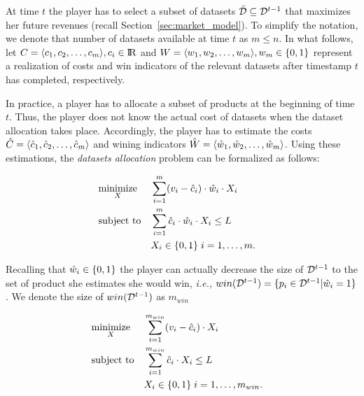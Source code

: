 At time $t$ the player has to select a subset of datasets $\bar{\mathcal{D}} \subseteq \mathcal{D}^{t-1}$ that maximizes her future revenues (recall Section~\ref{sec:market_model}). To simplify the notation, we denote that number of datasets available at time $t$ as $m\leq n$. In what follows, let $C = \langle c_1, c_2, \dots, c_{m}\rangle, c_i\in {\rm I\!R}$ and $W = \langle w_1, w_2, \dots, w_m\rangle, w_{m}\in \{0,1\}$ represent a realization of costs and win indicators of the relevant datasets after timestamp $t$ has completed, respectively.

In practice, a player has to allocate a subset of products at the beginning of time $t$. Thus, the player does not know the actual cost of datasets when the dataset allocation takes place. Accordingly, the player has to estimate the costs $\hat{C} = \langle \hat{c}_1, \hat{c}_2, \dots, \hat{c}_m\rangle$ and wining indicators $\hat{W} = \langle \hat{w}_1, \hat{w}_2, \dots, \hat{w}_m\rangle$. Using these estimations, the \emph{datasets allocation} problem can be formalized as follows:

\begin{equation}\label{eq:main1}
\begin{aligned}
& \underset{X}{\text{minimize}} & & \sum_{i=1}^{m} (v_{i} - \hat{c}_{i})\cdot\hat{w}_{i}\cdot X_{i} \\
& \text{subject to} & & \sum_{i=1}^{m} \hat{c}_{i}\cdot\hat{w}_{i}\cdot X_{i} \leq L \\
& & & X_{i} \in \{0,1\} \; i = 1, \ldots, m. & 
\end{aligned}
\end{equation}

\noindent Recalling that $\hat{w}_{i}\in \{0,1\}$ the player can actually decrease the size of $\mathcal{D}^{t-1}$ to the set of product she estimates she would win, \emph{i.e.,} $win(\mathcal{D}^{t-1}) = \{p_{i}\in \mathcal{D}^{t-1} | \hat{w}_{i} = 1\}$. We denote the size of $win(\mathcal{D}^{t-1})$ as $m_{win}$  

\begin{equation}\label{eq:main2}
\begin{aligned}
& \underset{X}{\text{minimize}} & & \sum_{i=1}^{m_{win}} (v_{i} - \hat{c}_{i})\cdot X_{i} \\
& \text{subject to} & & \sum_{i=1}^{m_{win}} \hat{c}_{i}\cdot X_{i} \leq L \\
& & & X_{i} \in \{0,1\} \; i = 1, \ldots, m_{win}. & 
\end{aligned}
\end{equation}

